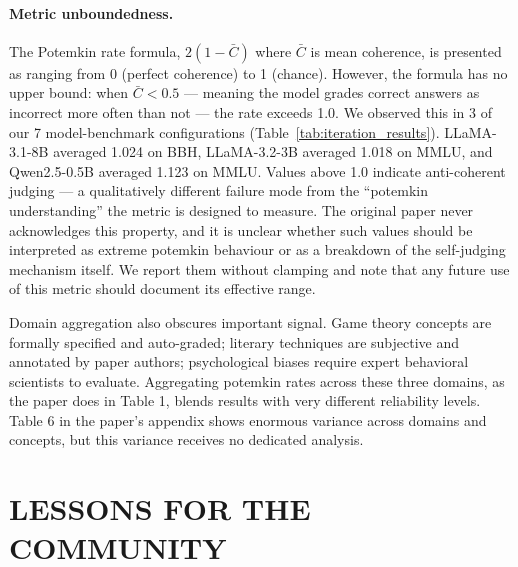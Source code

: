 \documentclass[sigconf,authordraft]{acmart}
\begin{document}
\paragraph{Metric unboundedness.}
The Potemkin rate formula, $2(1 - \bar{C})$ where $\bar{C}$ is mean coherence, is presented as ranging from 0 (perfect coherence) to 1 (chance). However, the formula has no upper bound: when $\bar{C} < 0.5$ --- meaning the model grades correct answers as incorrect more often than not --- the rate exceeds 1.0. We observed this in 3 of our 7 model-benchmark configurations (Table~\ref{tab:iteration_results}). LLaMA-3.1-8B averaged 1.024 on BBH, LLaMA-3.2-3B averaged 1.018 on MMLU, and Qwen2.5-0.5B averaged 1.123 on MMLU. Values above 1.0 indicate anti-coherent judging --- a qualitatively different failure mode from the ``potemkin understanding'' the metric is designed to measure. The original paper never acknowledges this property, and it is unclear whether such values should be interpreted as extreme potemkin behaviour or as a breakdown of the self-judging mechanism itself. We report them without clamping and note that any future use of this metric should document its effective range.

Domain aggregation also obscures important signal. Game theory concepts are formally specified and auto-graded; literary techniques are subjective and annotated by paper authors; psychological biases require expert behavioral scientists to evaluate. Aggregating potemkin rates across these three domains, as the paper does in Table 1, blends results with very different reliability levels. Table 6 in the paper's appendix shows enormous variance across domains and concepts, but this variance receives no dedicated analysis.


\section{ LESSONS FOR THE COMMUNITY}
\end{document}

